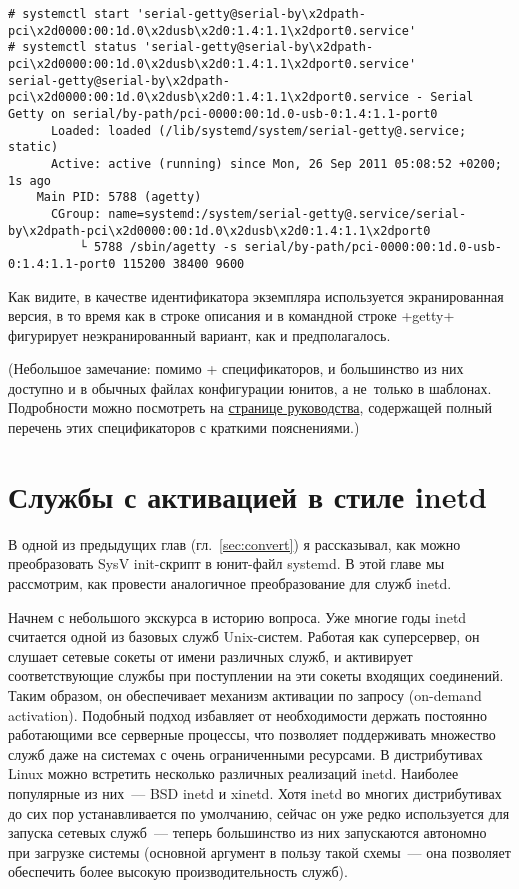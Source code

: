 \documentclass[10pt,oneside,a4paper]{article}
\begin{document}
\begin{landscape}
\begin{Verbatim}[fontsize=\small]
# systemctl start 'serial-getty@serial-by\x2dpath-pci\x2d0000:00:1d.0\x2dusb\x2d0:1.4:1.1\x2dport0.service'
# systemctl status 'serial-getty@serial-by\x2dpath-pci\x2d0000:00:1d.0\x2dusb\x2d0:1.4:1.1\x2dport0.service'
serial-getty@serial-by\x2dpath-pci\x2d0000:00:1d.0\x2dusb\x2d0:1.4:1.1\x2dport0.service - Serial Getty on serial/by-path/pci-0000:00:1d.0-usb-0:1.4:1.1-port0
	  Loaded: loaded (/lib/systemd/system/serial-getty@.service; static)
	  Active: active (running) since Mon, 26 Sep 2011 05:08:52 +0200; 1s ago
	Main PID: 5788 (agetty)
	  CGroup: name=systemd:/system/serial-getty@.service/serial-by\x2dpath-pci\x2d0000:00:1d.0\x2dusb\x2d0:1.4:1.1\x2dport0
		  └ 5788 /sbin/agetty -s serial/by-path/pci-0000:00:1d.0-usb-0:1.4:1.1-port0 115200 38400 9600
\end{Verbatim}
\end{landscape}
Как видите, в качестве идентификатора экземпляра используется экранированная
версия, в то время как в строке описания и в командной строке +getty+
фигурирует неэкранированный вариант, как и предполагалось.

(Небольшое замечание: помимо +%
спецификаторов, и большинство из них доступно и в обычных файлах конфигурации
юнитов, а не~только в шаблонах. Подробности можно посмотреть на
\href{http://www.freedesktop.org/software/systemd/man/systemd.unit.html}%
{странице руководства}, содержащей полный перечень этих спецификаторов с
краткими пояснениями.)

\section{Службы с активацией в стиле inetd}
\label{sec:inetd}

В одной из предыдущих глав (гл.~\ref{sec:convert}) я рассказывал, как можно
преобразовать SysV init-скрипт в юнит-файл systemd. В этой главе мы рассмотрим,
как провести аналогичное преобразование для служб inetd.

Начнем с небольшого экскурса в историю вопроса. Уже многие годы 
inetd считается одной из базовых служб Unix-систем. Работая как суперсервер, он
слушает сетевые сокеты от имени различных служб, и активирует соответствующие
службы при поступлении на эти сокеты входящих соединений. Таким образом, он
обеспечивает механизм активации по запросу (on-demand activation). Подобный
подход избавляет от необходимости держать постоянно работающими все серверные
процессы, что позволяет поддерживать множество служб даже на системах с очень
ограниченными ресурсами. В дистрибутивах Linux можно встретить
несколько различных реализаций inetd. Наиболее популярные из них~--- BSD
inetd и xinetd. Хотя inetd во многих дистрибутивах до сих пор устанавливается по
умолчанию, сейчас он уже редко используется для запуска сетевых служб~--- теперь 
большинство из них запускаются автономно при загрузке системы (основной
аргумент в пользу такой схемы~--- она позволяет обеспечить более высокую
производительность служб).
\end{document}
